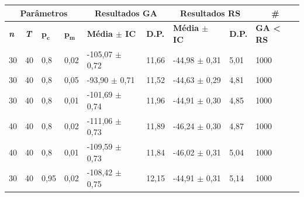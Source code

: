 \begin{table}[h!]
	\centering
	\begin{tabular}{|l|l|l|l|l|l|l|l|l|}
		\hline
		\multicolumn{4}{|c|}{\textbf{Parâmetros}}                                                    & \multicolumn{2}{c|}{\textbf{Resultados GA}}                                        & \multicolumn{2}{c|}{\textbf{Resultados RS}}                                        & \multicolumn{1}{c|}{\textbf{\#}}                      \\ \hline
		\textbf{\textit{n}} & \textbf{\textit{T}} & $\bm{p_c}$ & $\bm{p_m}$ & \textbf{Média $\pm$ IC} & \textbf{D.P.} & \textbf{Média $\pm$ IC} & \textbf{D.P.} & \textbf{GA < RS} \\ \hline
		30                          & 40                          & 0,8        & 0,02       & -105,07 $\pm$ 0,72                           & 11,66                          & -44,98 $\pm$ 0,31                            & 5,01                           & 1000                                      \\ \hline
		30                          & 40                          & 0,8        & 0,05       & -93,90 $\pm$ 0,71                            & 11,52                          & -44,63 $\pm$ 0,29                            & 4,81                           & 1000                                      \\ \hline
		30                          & 40                          & 0,8        & 0,01       & -101,69 $\pm$ 0,74                           & 11,96                          & -44,91 $\pm$ 0,30                            & 4,85                           & 1000                                      \\ \hline
		40                          & 40                          & 0,8        & 0,02       & -111,06 $\pm$ 0,73                           & 11,89                          & -46,24 $\pm$ 0,30                            & 4,87                           & 1000                                      \\ \hline
		40                          & 40                          & 0,8        & 0,01       & -109,59 $\pm$ 0,73                           & 11,84                          & -46,02 $\pm$ 0,31                            & 5,04                           & 1000                                      \\ \hline
		30                          & 40                          & 0,95       & 0,02       & -108,42 $\pm$ 0,75                           & 12,15                          & -44,91 $\pm$ 0,31                            & 5,14                           & 1000                                      \\ \hline

\end{tabular}
\end{table}
